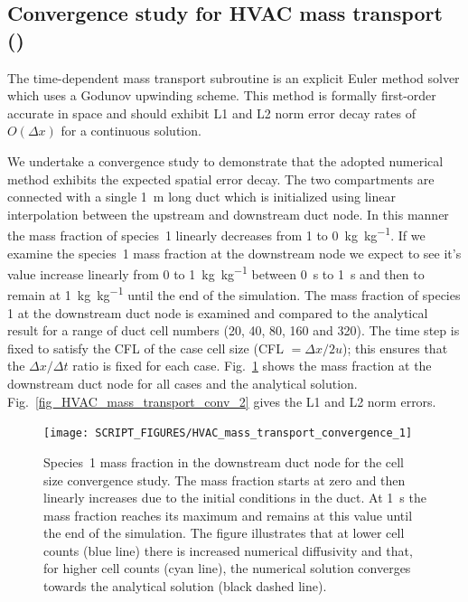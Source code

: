 \documentclass[11pt]{book}
\begin{document}
\subsection{Convergence study for HVAC mass transport (\texorpdfstring{}{HVAC\_mass\_transport\_conv\_x})}
\label{HVAC_mass_transport_conv_0020}
\label{HVAC_mass_transport_conv_0040}
\label{HVAC_mass_transport_conv_0080}
\label{HVAC_mass_transport_conv_0160}
\label{HVAC_mass_transport_conv_0320}
The time-dependent mass transport subroutine is an explicit Euler method solver which uses a Godunov upwinding scheme. This method is formally first-order accurate in space and should exhibit L1 and L2 norm error decay rates of \(O(\Delta x)\) for a continuous solution.

We undertake a convergence study to demonstrate that the adopted numerical method exhibits the expected spatial error decay. The two compartments are connected with a single \SI{1}{\meter} long duct which is initialized using linear interpolation between the upstream and downstream duct node. In this manner the mass fraction of species~1 linearly decreases from \num{1} to \SI[per-mode=symbol]{0}{\kilogram\per\kilogram}. If we examine the species~1 mass fraction at the downstream node we expect to see it's value increase linearly from \num{0} to \SI[per-mode=symbol]{1}{\kilogram\per\kilogram} between \SI{0}{\second} to \SI{1}{\second} and then to remain at \SI[per-mode=symbol]{1}{\kilogram\per\kilogram} until the end of the simulation. The mass fraction of species 1 at the downstream duct node is examined and compared to the analytical result for a range of duct cell numbers (20, 40, 80, 160 and 320). The time step is fixed to satisfy the CFL of the case cell size (CFL \(= \Delta x/2u\)); this ensures that the \(\Delta x/\Delta t\) ratio is fixed for each case. Fig.~\ref{fig_HVAC_mass_transport_conv_1} shows the mass fraction at the downstream duct node for all cases and the analytical solution. Fig.~\ref{fig_HVAC_mass_transport_conv_2} gives the L1 and L2 norm errors.

\begin{figure}[ht]
\centering
\texttt{[image: SCRIPT\_FIGURES/HVAC\_mass\_transport\_convergence\_1]}
\caption[ test case result.]{Species~\num{1} mass fraction in the downstream duct node for the cell size convergence study. The mass fraction starts at zero and then linearly increases due to the initial conditions in the duct. At \SI{1}{\second} the mass fraction reaches its maximum and remains at this value until the end of the simulation. The figure illustrates that at lower cell counts (blue line) there is increased numerical diffusivity and that, for higher cell counts (cyan line), the numerical solution converges towards the analytical solution (black dashed line).}
\label{fig_HVAC_mass_transport_conv_1}
\end{figure}
\end{document}

